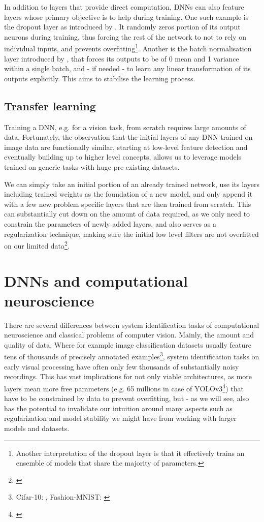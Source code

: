 In addition to layers that provide direct computation, DNNs can also feature layers whose primary objective is to help during training. One such example is the dropout layer as introduced by \cite{JMLR:v15:srivastava14a}. It randomly zeros portion of its output neurons during training, thus forcing the rest of the network to not to rely on individual inputs, and prevents overfitting\footnote{Another interpretation of the dropout layer is that it effectively trains an ensemble of models that share the majority of parameters.}. Another is the batch normalisation layer introduced by \cite{2015arXiv150203167I}, that forces its outputs to be of 0 mean and 1 variance within a single batch, and - if needed - to learn any linear transformation of its outputs explicitly. This aims to stabilise the learning process. 

\subsection{Transfer learning}
Training a DNN, e.g. for a vision task, from scratch requires large amounts of data. Fortunately, the observation that the initial layers of any DNN trained on image data are functionally similar, starting at low-level feature detection and eventually building up to higher level concepts, allows us to leverage models trained on generic tasks with huge pre-existing datasets. 

We can simply take an initial portion of an already trained network, use its layers including trained weights as the foundation of a new model, and only append it with a few new problem specific layers that are then trained from scratch. This can substantially cut down on the amount of data required, as we only need to constrain the parameters of newly added layers, and also serves as a regularization technique, making sure the initial low level filters are not overfitted on our limited data\footnote{\citep{2018arXiv180801974T}}. 

\section{DNNs and computational neuroscience}
There are several differences between system identification tasks of computational neuroscience and classical problems of computer vision. Mainly, the amount and quality of data. Where for example image classification datasets usually feature tens of thousands of precisely annotated examples\footnote{Cifar-10: \cite{cifar10}, Fashion-MNIST: \cite{xiao2017}}, system identification tasks on early visual processing have often only few thousands of substantially noisy recordings. This has vast implications for not only viable architectures, as more layers mean more free parameters (e.g. 65 millions in case of YOLOv3\footnote{\citep{2018arXiv180402767R}}) that have to be constrained by data to prevent overfitting, but - as we will see, also has the potential to invalidate our intuition around many aspects such as regularization and model stability we might have from working with larger models and datasets. 

